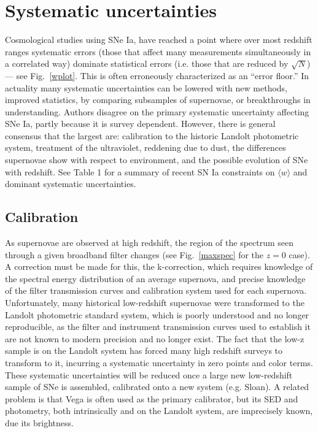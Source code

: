 \documentclass{nature1}
\begin{document}
\section{Systematic uncertainties}
Cosmological studies using SNe Ia, have reached a point where over
most redshift ranges systematic errors (those that affect many
measurements simultaneously in a correlated way) dominate statistical
errors (i.e. those that are reduced by
$\sqrt{N}$)\citep{2009ApJS..185...32K, 2009ApJ...700.1097H,
  2010ApJ...716..712A} --- see Fig.~\ref{wplot}.  This is often
erroneously characterized as an ``error floor.''  In actuality many
systematic uncertainties can be lowered with new methods, improved
statistics, by comparing subsamples of supernovae, or breakthroughs in
understanding.  Authors disagree on the primary systematic uncertainty
affecting SNe Ia, partly because it is survey dependent.  However,
there is general consensus that the largest are: calibration to the
historic Landolt photometric system, treatment of the ultraviolet,
reddening due to dust, the differences supernovae show with respect to
environment, and the possible evolution of SNe with redshift.  See
Table 1 for a summary of recent SN Ia constraints on $\langle w
\rangle$ and dominant systematic uncertainties.

\subsection{Calibration}
As supernovae are observed at high redshift, the region of the
spectrum seen through a given broadband filter changes (see Fig.~\ref{maxspec} for the $z=0$ case).  A correction
must be made for this, the k-correction, which requires
knowledge of the spectral energy distribution of an average
supernova\citep{2007ApJ...663.1187H}, and precise knowledge of the
filter transmission curves and calibration system used for each
supernova.  Unfortunately, many historical low-redshift supernovae
were transformed to the Landolt photometric standard system, which is
poorly understood and no longer reproducible, as the filter and
instrument transmission curves used to establish it are not known to 
modern precision and no longer exist.  The fact that the low-z sample
is on the Landolt system has forced many high redshift surveys to
transform to it, incurring a systematic uncertainty in zero points and
color terms\citep{2006A&A...447...31A}.  These systematic
uncertainties will be reduced once a large new low-redshift sample of
SNe is assembled, calibrated onto a new system (e.g. Sloan).  A
related problem is that Vega is often used as the primary calibrator,
but its SED and photometry, both intrinsically and on the Landolt
system, are imprecisely known, due its brightness.
\end{document}
